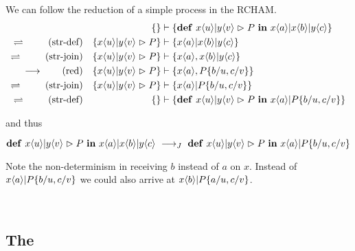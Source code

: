 \begin{example}
\label{example_cham}
We can follow the reduction of a simple process in the RCHAM.
\begin{align*}
  &&\rchamcnfset*
    {}
    {\jdef
      {\jrct{\jrcv{x}{u} \jpat \jrcv{y}{v}}{P}}
      {\jsnd{x}{a} \jpar \jsnd{x}{b} \jpar \jsnd{y}{c}}}
  \\
  \rchamheating\ \tag{str-def}
  &&\rchamcnfset*
    {\jrct{\jrcv{x}{u} \jpat \jrcv{y}{v}}{P}}
    {\jsnd{x}{a} \jpar \jsnd{x}{b} \jpar \jsnd{y}{c}}
  \\
  \rchamheating\ \tag{str-join}
  &&\rchamcnfset*
    {\jrct{\jrcv{x}{u} \jpat \jrcv{y}{v}}{P}}
    {\jsnd{x}{a}, \jsnd{x}{b} \jpar \jsnd{y}{c}}
  \\
  \rchamreduction \tag{red}
  &&\rchamcnfset*
    {\jrct{\jrcv{x}{u} \jpat \jrcv{y}{v}}{P}}
    {\jsnd{x}{a}, P\substitution{\subst{b}{u}, \subst{c}{v}}}
  \\
  \rchamheating\ \tag{str-join}
  &&\rchamcnfset*
    {\jrct{\jrcv{x}{u} \jpat \jrcv{y}{v}}{P}}
    {\jsnd{x}{a} \jpar P\substitution{\subst{b}{u}, \subst{c}{v}}}
  \\
  \rchamheating\ \tag{str-def}
  &&\rchamcnfset*
    {}
    {\jdef
      {\jrct{\jrcv{x}{u} \jpat \jrcv{y}{v}}{P}}
      {\jsnd{x}{a} \jpar P\substitution{\subst{b}{u}, \subst{c}{v}}}}
\end{align*}

and thus

\begin{equation*}
  \jdef
    {\jrct{\jrcv{x}{u} \jpat \jrcv{y}{v}}{P}}
    {\jsnd{x}{a} \jpar \jsnd{x}{b} \jpar \jsnd{y}{c}}
  \ \joinreduction\ 
  \jdef
    {\jrct{\jrcv{x}{u} \jpat \jrcv{y}{v}}{P}}
    {\jsnd{x}{a} \jpar P\substitution{\subst{b}{u}, \subst{c}{v}}}
\end{equation*}

Note the non-determinism in receiving $b$ instead of $a$ on $x$.
Instead of
$ x\langle a\rangle | P\{ b / u, c / v \} $
we could also arrive at
$ x\langle b\rangle | P\{ a / u, c / v \} $.
\end{example}

\begin{example}\ \\
\end{example}


\subsection{The \CoreJoinCalc}

